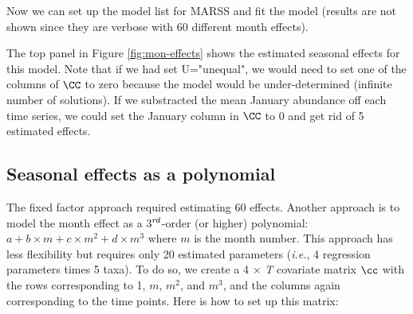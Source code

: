 Now we can set up the model list for MARSS and fit the model (results are not shown since they are verbose with 60 different month effects).
\begin{Schunk}
\end{Schunk}

The top panel in Figure \ref{fig:mon-effects} shows the estimated seasonal effects for this model.  Note that if we had set U="unequal", we would need to set one of the columns of $\CC$ to zero because the model would be under-determined (infinite number of solutions). If we substracted the mean January abundance off each time series, we could set the January column in $\CC$ to 0 and get rid of 5 estimated effects.

\subsection{Seasonal effects as a polynomial}

The fixed factor approach required estimating 60 effects.  Another approach is to model the month effect as a 3$^\emph{rd}$-order (or higher) polynomial: $a+b\times m + c\times m^2 + d \times m^3$ where $m$ is the month number. This approach has less flexibility but requires only 20 estimated parameters (\emph{i.e.}, 4 regression parameters times 5 taxa).  To do so, we create a 4 $\times$ \emph{T} covariate matrix $\cc$ with the rows corresponding to 1, $m$, $m^2$, and $m^3$, and the columns again corresponding to the time points.  Here is how to set up this matrix:

